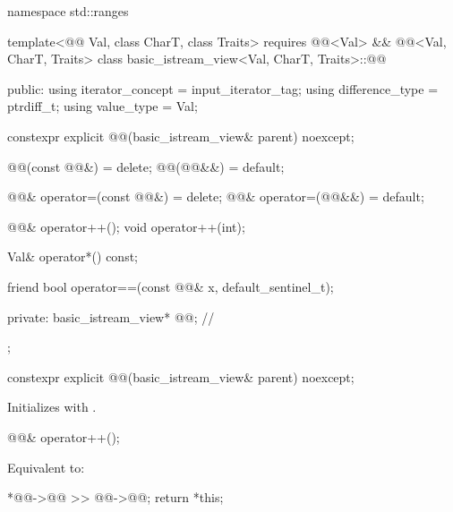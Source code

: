 \begin{codeblock}
namespace std::ranges {
  template<@@ Val, class CharT, class Traits>
    requires @@<Val> &&
             @@<Val, CharT, Traits>
  class basic_istream_view<Val, CharT, Traits>::@@ {
  public:
    using iterator_concept = input_iterator_tag;
    using difference_type = ptrdiff_t;
    using value_type = Val;

    constexpr explicit @@(basic_istream_view& parent) noexcept;

    @@(const @@&) = delete;
    @@(@@&&) = default;

    @@& operator=(const @@&) = delete;
    @@& operator=(@@&&) = default;

    @@& operator++();
    void operator++(int);

    Val& operator*() const;

    friend bool operator==(const @@& x, default_sentinel_t);

  private:
    basic_istream_view* @@;                                // \expos
  };
}
\end{codeblock}

%
\begin{itemdecl}
constexpr explicit @@(basic_istream_view& parent) noexcept;
\end{itemdecl}

\begin{itemdescr}
\pnum
\effects
Initializes  with .
\end{itemdescr}

%
\begin{itemdecl}
@@& operator++();
\end{itemdecl}

\begin{itemdescr}
\pnum
\effects
Equivalent to:
\begin{codeblock}
*@@->@@ >> @@->@@;
return *this;
\end{codeblock}
\end{itemdescr}

